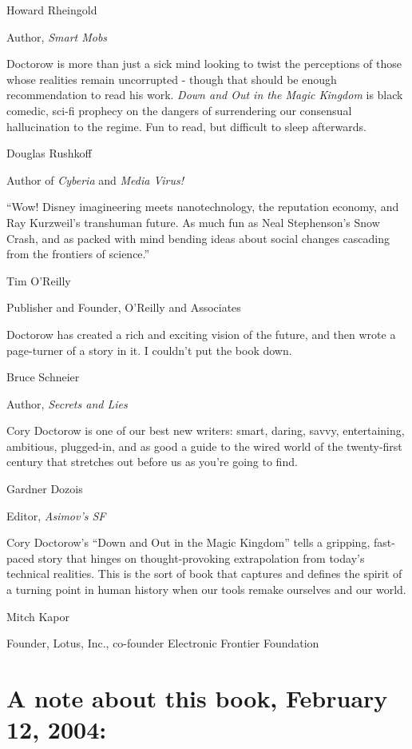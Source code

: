Howard Rheingold

Author, \emph{Smart Mobs}

Doctorow is more than just a sick mind looking to twist the
perceptions of those whose realities remain uncorrupted - though
that should be enough recommendation to read his work.
\emph{Down and Out in the Magic Kingdom} is black comedic, sci-fi
prophecy on the dangers of surrendering our consensual
hallucination to the regime. Fun to read, but difficult to sleep
afterwards.

Douglas Rushkoff

Author of \emph{Cyberia} and \emph{Media Virus!}

“Wow! Disney imagineering meets nanotechnology, the reputation
economy, and Ray Kurzweil's transhuman future. As much fun as Neal
Stephenson's Snow Crash, and as packed with mind bending ideas
about social changes cascading from the frontiers of science.”

Tim O'Reilly

Publisher and Founder, O'Reilly and Associates

Doctorow has created a rich and exciting vision of the future, and
then wrote a page-turner of a story in it. I couldn't put the book
down.

Bruce Schneier

Author, \emph{Secrets and Lies}

Cory Doctorow is one of our best new writers: smart, daring, savvy,
entertaining, ambitious, plugged-in, and as good a guide to the
wired world of the twenty-first century that stretches out before
us as you're going to find.

Gardner Dozois

Editor, \emph{Asimov's SF}

Cory Doctorow's “Down and Out in the Magic Kingdom” tells a
gripping, fast-paced story that hinges on thought-pro\-vok\-ing
extrapolation from today's technical realities. This is the sort of
book that captures and defines the spirit of a turning point in
human history when our tools remake ourselves and our world.

Mitch Kapor

Founder, Lotus, Inc., co-founder Electronic Frontier Foundation

\section{A note about this book, February 12, 2004:}

